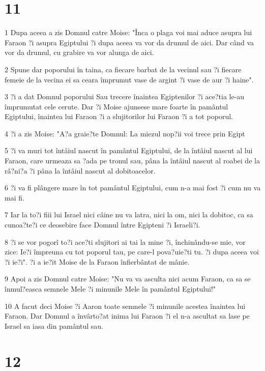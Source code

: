 \chapter{11}

\par 1 Dupa aceea a zis Domnul catre Moise: "Înca o plaga voi mai aduce asupra lui Faraon ?i asupra Egiptului ?i dupa aceea va vor da drumul de aici. Dar când va vor da drumul, cu grabire va vor alunga de aici.
\par 2 Spune dar poporului în taina, ca fiecare barbat de la vecinul sau ?i fiecare femeie de la vecina ei sa ceara împrumut vase de argint ?i vase de aur ?i haine".
\par 3 ?i a dat Domnul poporului Sau trecere înaintea Egiptenilor ?i ace?tia le-au împrumutat cele cerute. Dar ?i Moise ajunsese mare foarte în pamântul Egiptului, înaintea lui Faraon ?i a slujitorilor lui Faraon ?i a tot poporul.
\par 4 ?i a zis Moise: "A?a graie?te Domnul: La miezul nop?ii voi trece prin Egipt
\par 5 ?i va muri tot întâiul nascut în pamântul Egiptului, de la întâiul nascut al lui Faraon, care urmeaza sa ?ada pe tronul sau, pâna la întâiul nascut al roabei de la râ?ni?a ?i pâna la întâiul nascut al dobitoacelor.
\par 6 ?i va fi plângere mare în tot pamântul Egiptului, cum n-a mai fost ?i cum nu va mai fi.
\par 7 Iar la to?i fiii lui Israel nici câine nu va latra, nici la om, nici la dobitoc, ca sa cunoa?te?i ce deosebire face Domnul între Egipteni ?i Israeli?i.
\par 8 ?i se vor pogorî to?i ace?ti slujitori ai tai la mine ?i, închinându-se mie, vor zice: Ie?i împreuna cu tot poporul tau, pe care-l pova?uie?ti tu. ?i dupa aceea voi ?i ie?i". ?i a ie?it Moise de la Faraon înfierbântat de mânie.
\par 9 Apoi a zis Domnul catre Moise: "Nu va va asculta nici acum Faraon, ca sa se înmul?easca semnele Mele ?i minunile Mele în pamântul Egiptului!"
\par 10 A facut deci Moise ?i Aaron toate semnele ?i minunile acestea înaintea lui Faraon. Dar Domnul a învârto?at inima lui Faraon ?i el n-a ascultat sa lase pe Israel sa iasa din pamântul sau.

\chapter{12}

